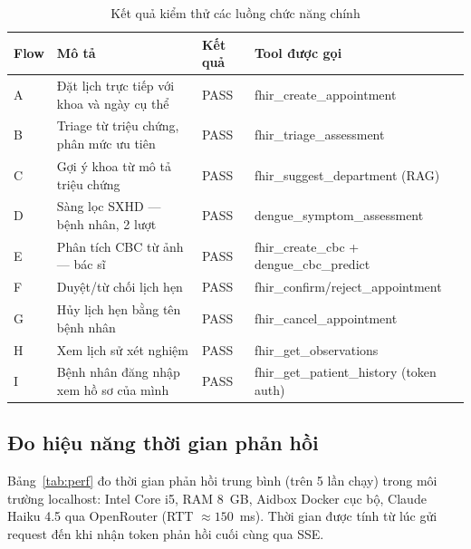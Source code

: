 \documentclass[oneside, a4paper]{book}
\theoremstyle{plain}
\theoremstyle{plain}
\theoremstyle{definition}
\theoremstyle{remark}
\begin{document}
\begin{table}[H]
\centering
\begin{tabular}{|l|p{4cm}|p{2.5cm}|p{4cm}|}
\hline
\textbf{Flow} & \textbf{Mô tả} & \textbf{Kết quả} & \textbf{Tool được gọi} \\
\hline
A & Đặt lịch trực tiếp với khoa và ngày cụ thể & PASS & fhir\_create\_appointment \\
B & Triage từ triệu chứng, phân mức ưu tiên & PASS & fhir\_triage\_assessment \\
C & Gợi ý khoa từ mô tả triệu chứng & PASS & fhir\_suggest\_department (RAG) \\
D & Sàng lọc SXHD --- bệnh nhân, 2 lượt & PASS & dengue\_symptom\_assessment \\
E & Phân tích CBC từ ảnh --- bác sĩ & PASS & fhir\_create\_cbc + dengue\_cbc\_predict \\
F & Duyệt/từ chối lịch hẹn & PASS & fhir\_confirm/reject\_appointment \\
G & Hủy lịch hẹn bằng tên bệnh nhân & PASS & fhir\_cancel\_appointment \\
H & Xem lịch sử xét nghiệm & PASS & fhir\_get\_observations \\
I & Bệnh nhân đăng nhập xem hồ sơ của mình & PASS & fhir\_get\_patient\_history (token auth) \\
\hline
\end{tabular}
\caption{Kết quả kiểm thử các luồng chức năng chính}
\label{tab:flow-test}
\end{table}

\subsection{Đo hiệu năng thời gian phản hồi}

Bảng~\ref{tab:perf} đo thời gian phản hồi trung bình (trên 5 lần chạy) trong môi trường localhost: Intel Core i5, RAM 8~GB, Aidbox Docker cục bộ, Claude Haiku 4.5 qua OpenRouter (RTT $\approx 150$~ms). Thời gian được tính từ lúc gửi request đến khi nhận token phản hồi cuối cùng qua SSE.
\end{document}
